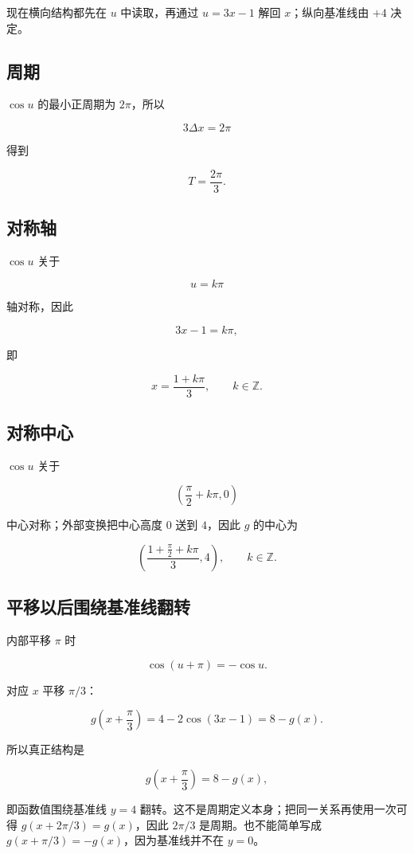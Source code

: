 \documentclass[11pt,a4paper]{ctexart}
\begin{document}
现在横向结构都先在 \(u\) 中读取，再通过 \(u=3x-1\) 解回
\(x\)；纵向基准线由 \(+4\) 决定。

\subsection{周期}\label{ux5468ux671f-2}

\(\cos u\) 的最小正周期为 \(2\pi\)，所以

\[
3\Delta x=2\pi
\]

得到

\[
\boxed{T=\frac{2\pi}{3}}.
\]

\subsection{对称轴}\label{ux5bf9ux79f0ux8f74-1}

\(\cos u\) 关于

\[
u=k\pi
\]

轴对称，因此

\[
3x-1=k\pi,
\]

即

\[
\boxed{x=\frac{1+k\pi}{3}},\qquad k\in\mathbb Z.
\]

\subsection{对称中心}\label{ux5bf9ux79f0ux4e2dux5fc3-1}

\(\cos u\) 关于

\[
\left(\frac\pi2+k\pi,0\right)
\]

中心对称；外部变换把中心高度 \(0\) 送到 \(4\)，因此 \(g\) 的中心为

\[
\boxed{
\left(
\frac{1+\frac\pi2+k\pi}{3},
4
\right)
},\qquad k\in\mathbb Z.
\]

\subsection{平移以后围绕基准线翻转}\label{ux5e73ux79fbux7ffbux8f6cux6bcdux4f8b}

内部平移 \(\pi\) 时

\[
\cos(u+\pi)=-\cos u.
\]

对应 \(x\) 平移 \(\pi/3\)：

\[
g\left(x+\frac\pi3\right)
=4-2\cos(3x-1)
=8-g(x).
\]

所以真正结构是

\[
\boxed{g\left(x+\frac\pi3\right)=8-g(x)},
\]

即函数值围绕基准线 \(y=4\) 翻转。这不是周期定义本身；把同一关系再使用一次可得 $g(x+2\pi/3)=g(x)$，因此 $2\pi/3$ 是周期。也不能简单写成 \(g(x+\pi/3)=-g(x)\)，因为基准线并不在 \(y=0\)。
\end{document}
